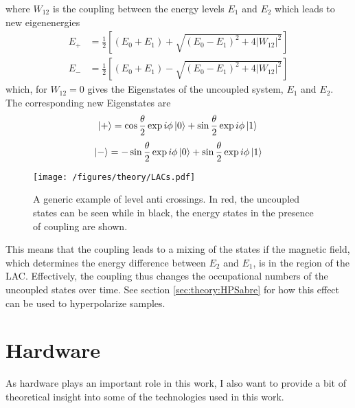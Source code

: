         where $W_{12}$ is the coupling between the energy levels $E_1$ and $E_2$ which leads to new eigenenergies
        \begin{align*}
            E_+ &= \frac{1}{2} \left[(E_0+ E_1) + \sqrt{(E_0-E_1)^2+4|W_{12}|^2}\right]\\
            E_- &= \frac{1}{2} \left[(E_0+ E_1) - \sqrt{(E_0-E_1)^2+4|W_{12}|^2}\right]
        \end{align*}
        which, for $W_{12}=0$ gives the Eigenstates of the uncoupled system, $E_1$ and $E_2$. The corresponding new Eigenstates are 
        \begin{equation*}
            \ket{+} = \cos\frac{{\theta}}{2}\exp{i\phi}\ket{0} + \sin{\frac{\theta}{2}}\exp{i\phi}\ket{1}\\
        \end{equation*}
        \begin{equation*}
            \ket{-} = -\sin{\frac{\theta}{2}}\exp{i\phi}\ket{0} + \sin{\frac{\theta}{2}}\exp{i\phi}\ket{1}
        \end{equation*}
            \begin{figure}
                \centering
                \texttt{[image: /figures/theory/LACs.pdf]}
                \caption[Level anti crossings]{A generic example of level anti crossings. In red, the uncoupled states can be seen while in black, the energy states in the presence of coupling are shown.}
                \label{figure:theory:LAC}
            \end{figure}
            This means that the coupling leads to a mixing of the states if the magnetic field, which determines the energy difference between $E_2$ and $E_1$, is in the region of the LAC. Effectively, the coupling thus changes the occupational numbers of the uncoupled states over time. See section \ref{sec:theory:HPSabre} for how this effect can be used to hyperpolarize samples.
        \section{Hardware}
            As hardware plays an important role in this work, I also want to provide a bit of theoretical insight into some of the technologies used in this work.
